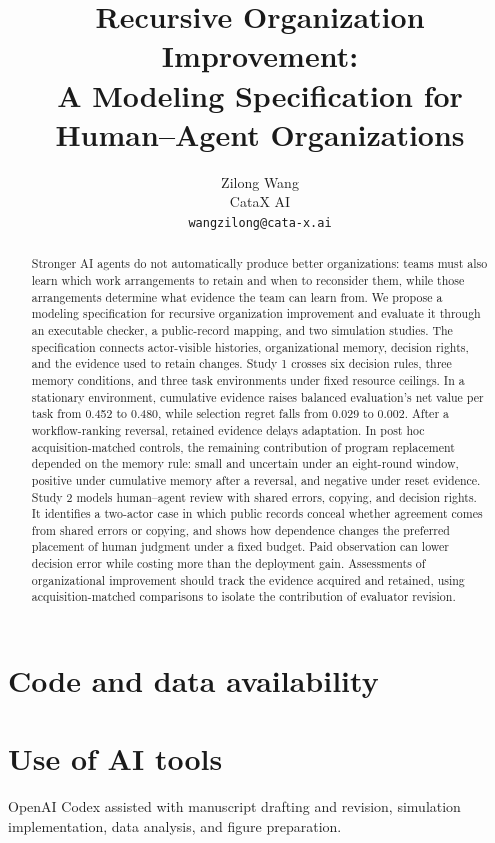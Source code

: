 \documentclass[10pt]{article}
\title{Recursive Organization Improvement:\\A Modeling Specification for Human--Agent Organizations}
\author{
  Zilong Wang \\
  CataX AI \\
  \texttt{wangzilong@cata-x.ai}
}
\date{}
\begin{document}
\maketitle
\begin{abstract}
Stronger AI agents do not automatically produce better organizations: teams must also learn which work arrangements to retain and when to reconsider them, while those arrangements determine what evidence the team can learn from. We propose a modeling specification for recursive organization improvement and evaluate it through an executable checker, a public-record mapping, and two simulation studies. The specification connects actor-visible histories, organizational memory, decision rights, and the evidence used to retain changes. Study 1 crosses six decision rules, three memory conditions, and three task environments under fixed resource ceilings. In a stationary environment, cumulative evidence raises balanced evaluation's net value per task from 0.452 to 0.480, while selection regret falls from 0.029 to 0.002. After a workflow-ranking reversal, retained evidence delays adaptation. In post hoc acquisition-matched controls, the remaining contribution of program replacement depended on the memory rule: small and uncertain under an eight-round window, positive under cumulative memory after a reversal, and negative under reset evidence. Study 2 models human--agent review with shared errors, copying, and decision rights. It identifies a two-actor case in which public records conceal whether agreement comes from shared errors or copying, and shows how dependence changes the preferred placement of human judgment under a fixed budget. Paid observation can lower decision error while costing more than the deployment gain. Assessments of organizational improvement should track the evidence acquired and retained, using acquisition-matched comparisons to isolate the contribution of evaluator revision.
\end{abstract}





\section*{Code and data availability}

\section*{Use of AI tools}
OpenAI Codex assisted with manuscript drafting and revision, simulation implementation, data analysis, and figure preparation.
\FloatBarrier
\begingroup
\small
\setlength{\bibsep}{1pt}


\endgroup
\clearpage
\appendix

\FloatBarrier

\FloatBarrier
\clearpage

\end{document}
